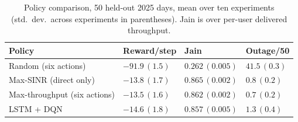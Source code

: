 \documentclass[]{ieeeaccess}
\begin{document}
\begin{table}[t]
\centering
\caption{Policy comparison, 50 held-out 2025 days, mean over ten experiments (std.\ dev.\ across experiments in parentheses). Jain is over per-user delivered throughput.}
\label{tab:dqn-all-policies}
{\scriptsize\setlength{\tabcolsep}{3pt}
\begin{tabularx}{\columnwidth}{|>{\raggedright\arraybackslash}X|>{\centering\arraybackslash}X|>{\centering\arraybackslash}X|>{\centering\arraybackslash}X|}
\hline
\textbf{Policy} & \textbf{Reward/step} & \textbf{Jain} & \textbf{Outage/50} \\
\hline
Random (six actions) & $-91.9\,(1.5)$ & $0.262\,(0.005)$ & $41.5\,(0.3)$ \\
\hline
Max-SINR (direct only) & $-13.8\,(1.7)$ & $\mathbf{0.865}\,(0.002)$ & $0.8\,(0.2)$ \\
\hline
Max-throughput (six actions) & $\mathbf{-13.5}\,(1.6)$ & $0.862\,(0.002)$ & $\mathbf{0.7}\,(0.2)$ \\
\hline
LSTM + DQN & $-14.6\,(1.8)$ & $0.857\,(0.005)$ & $1.3\,(0.4)$ \\
\hline
\end{tabularx}}
\end{table}
\end{document}
